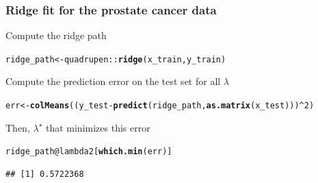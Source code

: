 \documentclass[10pt, c, xcolor=x11names]{beamer}\usepackage[]{graphicx}\usepackage[]{color}
\makeatletter
\newcommand{\hlnum}[1]{\textcolor[rgb]{0.686,0.059,0.569}{#1}}%
\newcommand{\hlopt}[1]{\textcolor[rgb]{0,0,0}{#1}}%
\newcommand{\hlstd}[1]{\textcolor[rgb]{0.345,0.345,0.345}{#1}}%
\newcommand{\hlkwb}[1]{\textcolor[rgb]{0.69,0.353,0.396}{#1}}%
\newcommand{\hlkwc}[1]{\textcolor[rgb]{0.333,0.667,0.333}{#1}}%
\newcommand{\hlkwd}[1]{\textcolor[rgb]{0.737,0.353,0.396}{\textbf{#1}}}%
\newenvironment{kframe}{%
 \def\at@end@of@kframe{}%
 \ifinner\ifhmode%
  \def\at@end@of@kframe{\end{minipage}}%
  \begin{minipage}{\columnwidth}%
 \fi\fi%
 \def\FrameCommand##1{\hskip\@totalleftmargin \hskip-\fboxsep
 \colorbox{shadecolor}{##1}\hskip-\fboxsep
     \hskip-\linewidth \hskip-\@totalleftmargin \hskip\columnwidth}%
 \MakeFramed {\advance\hsize-\width
   \@totalleftmargin\z@ \linewidth\hsize
   \@setminipage}}%
 {\par\unskip\endMakeFramed%
 \at@end@of@kframe}
\newenvironment{knitrout}{}{} %
\makeatother
\begin{document}







\begin{frame}[containsverbatim]
  \frametitle{Ridge fit for the prostate cancer data}

  \vfill

Compute the ridge path
\begin{knitrout}\scriptsize
{}\color{fgcolor}\begin{kframe}
\begin{alltt}
\hlstd{ridge_path} \hlkwb{<-} \hlstd{quadrupen}\hlopt{::}\hlkwd{ridge}\hlstd{(x_train, y_train)}
\end{alltt}
\end{kframe}
\end{knitrout}

\vfill

Compute the prediction error on the test set for all $\lambda$
\begin{knitrout}\scriptsize
{}\color{fgcolor}\begin{kframe}
\begin{alltt}
\hlstd{err} \hlkwb{<-} \hlkwd{colMeans}\hlstd{((y_test} \hlopt{-} \hlkwd{predict}\hlstd{(ridge_path,} \hlkwd{as.matrix}\hlstd{(x_test)))}\hlopt{^}\hlnum{2}\hlstd{)}
\end{alltt}
\end{kframe}
\end{knitrout}

\vfill

Then, $\lambda^\star$ that minimizes this error
\begin{knitrout}\scriptsize
{}\color{fgcolor}\begin{kframe}
\begin{alltt}
\hlstd{ridge_path}\hlopt{@}\hlkwc{lambda2}\hlstd{[}\hlkwd{which.min}\hlstd{(err)]}
\end{alltt}
\begin{verbatim}
## [1] 0.5722368
\end{verbatim}
\end{kframe}
\end{knitrout}


\end{frame}
\end{document}
